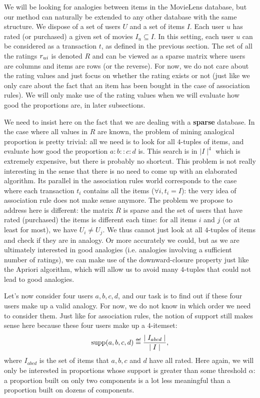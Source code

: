We will be looking for analogies between items in the MovieLens database, but
our method can naturally be extended to any other database with the same
structure.  We dispose of a set of users $U$ and a set of items $I$. Each user
$u$ has rated (or purchased) a given set of movies $I_u \subseteq I$. In this
setting, each user $u$ can be considered as a transaction $t$, as
defined in the previous section. The set of all the ratings $r_{ui}$ is denoted
$R$ and can be viewed as a sparse matrix where users are columns and items are
rows (or the reverse).  For now, we do not care about the rating values and
just focus on whether the rating exists or not (just like we only care about
the fact that an item has been bought in the case of association rules). We
will only make use of the rating values when we will evaluate how good the
proportions are, in later subsections.

We need to insist here on the fact that we are dealing with a \textbf{sparse}
database.  In the case where all values in $R$ are known, the problem of mining
analogical proportion is pretty trivial: all we need is to look for all
$4$-tuples of items, and evaluate how good the proportion $a:b::c:d$ is. This
search is in $\mid I \mid^4$ which is extremely expensive, but there is
probably no shortcut. This problem is not really interesting in the sense that
there is no need to come up with an elaborated algorithm. Its parallel in the
association rules world corresponds to the case where each transaction
$t_i$ contains all the items ($\forall i, t_i = I$): the very idea of
association rule does not make sense anymore. The problem we propose to address
here is different: the matrix $R$ is sparse and the set of users that have
rated (purchased) the items is different each time: for all items $i$ and $j$
(or at least for most), we have $U_i \neq U_j$. We thus cannot just look at all
$4$-tuples of items and check if they are in analogy. Or more accurately we
could, but as we are ultimately interested in good analogies (i.e. analogies
involving a sufficient number of ratings), we can make use of the
downward-closure property just like the Apriori algorithm, which will allow us
to avoid many $4$-tuples that could not lead to good analogies.

Let's now consider four users $a, b, c, d$, and our task is to find out if
these four users make up a valid analogy. For now, we do not know in which
order we need to consider them.  Just like for association rules, the notion of
support still makes sense here because these four users make up a $4$-itemset:
$$\supp(a, b, c, d) \eqdef \frac{\mid I_{abcd}\mid}{\mid I\mid},$$
where $I_{abcd}$ is the set of items that $a, b, c$ and $d$ have all rated.
Here again, we will only be interested in proportions whose support is greater
than some threshold $\alpha$: a proportion built on only two components is a
lot less meaningful than a proportion built on dozens of components.

